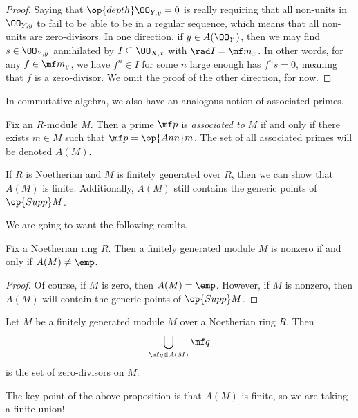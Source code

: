 \documentclass[../notes.tex]{subfiles}
\begin{document}
\begin{proof}
	Saying that $\op{depth}\OO_{Y,y}=0$ is really requiring that all non-units in $\OO_{Y,y}$ to fail to be able to be in a regular sequence, which means that all non-units are zero-divisors. In one direction, if $y\in A(\OO_Y)$, then we may find $s\in\OO_{Y,y}$ annihilated by $I\subseteq\OO_{X,x}$ with $\rad I=\mf m_x$. In other words, for any $f\in\mf m_y$, we have $f^n\in I$ for some $n$ large enough has $f^ns=0$, meaning that $f$ is a zero-divisor. We omit the proof of the other direction, for now.
\end{proof}
In commutative algebra, we also have an analogous notion of associated primes.
\begin{definition}
	Fix an $R$-module $M$. Then a prime $\mf p$ is \textit{associated to $M$} if and only if there exists $m\in M$ such that $\mf p=\op{Ann}m$. The set of all associated primes will be denoted $A(M)$.
\end{definition}
\begin{remark}
	If $R$ is Noetherian and $M$ is finitely generated over $R$, then we can show that $A(M)$ is finite. Additionally, $A(M)$ still contains the generic points of $\op{Supp}M$.
\end{remark}
We are going to want the following results.
\begin{lemma}
	Fix a Noetherian ring $R$. Then a finitely generated module $M$ is nonzero if and only if $A(M)\ne\emp$.
\end{lemma}
\begin{proof}
	Of course, if $M$ is zero, then $A(M)=\emp$. However, if $M$ is nonzero, then $A(M)$ will contain the generic points of $\op{Supp}M$.
\end{proof}
\begin{proposition}
	Let $M$ be a finitely generated module $M$ over a Noetherian ring $R$. Then
	\[\bigcup_{\mf q\in A(M)}\mf q\]
	is the set of zero-divisors on $M$.
\end{proposition}
The key point of the above proposition is that $A(M)$ is finite, so we are taking a finite union!
\end{document}
